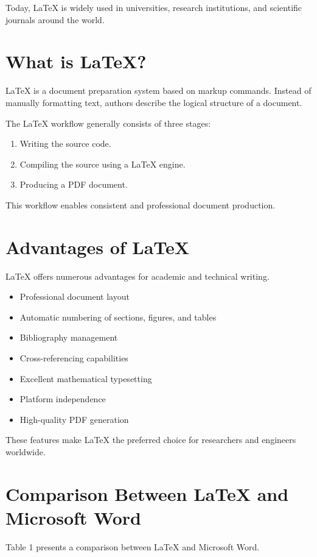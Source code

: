\documentclass{academic-template}
\begin{document}
Today, LaTeX is widely used in universities, research institutions, and scientific journals around the world.

\section{What is LaTeX?}

LaTeX is a document preparation system based on markup commands. Instead of manually formatting text, authors describe the logical structure of a document.

The LaTeX workflow generally consists of three stages:

\begin{enumerate}
\item Writing the source code.
\item Compiling the source using a LaTeX engine.
\item Producing a PDF document.
\end{enumerate}

This workflow enables consistent and professional document production.

\section{Advantages of LaTeX}

LaTeX offers numerous advantages for academic and technical writing.

\begin{itemize}
\item Professional document layout
\item Automatic numbering of sections, figures, and tables
\item Bibliography management
\item Cross-referencing capabilities
\item Excellent mathematical typesetting
\item Platform independence
\item High-quality PDF generation
\end{itemize}

These features make LaTeX the preferred choice for researchers and engineers worldwide.

\section{Comparison Between LaTeX and Microsoft Word}

Table 1 presents a comparison between LaTeX and Microsoft Word.
\end{document}
